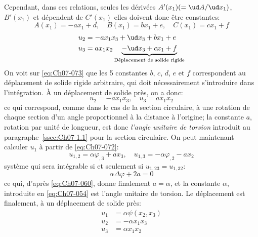 Cependant, dans ces relations, seules les dérivées $A'(x_1) (=\ud A /\ud x_1)$, $B'(x_1)$ et dépendent de $C'(x_1)$  elles doivent donc être constantes:
\[
A(x_1) = -a x_1 +d,\quad B(x_1) = b x_1 +e,\quad C(x_1) = c x_1 +f
\]
\begin{equation}
    \begin{aligned}
        u_2 &= -a x_1 x_3 + \ud x_3 + b x_1 + e\\
        u_3 &= a x_1 x_2 \underbrace{- \ud x_3 + c x_1 + f}_{\text{Déplacement de solide rigide}}
    \end{aligned}
    \label{eq:Ch07-073} 
\end{equation}
On voit sur \eqref{eq:Ch07-073} que les 5 constantes $b$, $c$, $d$, $e$ et $f$ correspondent au déplacement de solide rigide arbitraire, qui doit nécessairement s'introduire dans l'intégration.
À un déplacement de solide près, on a donc: 
\begin{equation}
    u_2 = -a x_1 x_3, \quad u_3 = a x_1 x_2
    \label{eq:Ch07-074}
\end{equation}
ce qui correspond, comme dans le cas de la section circulaire, à une rotation de chaque section d'un angle proportionnel à la distance à l'origine; la constante $a$, rotation par unité de longueur, est donc \emph{l'angle unitaire de torsion} introduit au paragraphe~\ref{ssec:Ch07-1.1} pour la section circulaire.
On peut maintenant calculer $u_1$ à partir de \eqref{eq:Ch07-072}: 
\begin{equation}
    u_{1,2} = \alpha \varphi_{,3} + a x_3, \quad u_{1,3} = -\alpha \varphi_{,2} - a x_2
    \label{eq:Ch07-075}
\end{equation}
système qui sera intégrable si et seulement si $u_{1,23} = u_{1,32}$:
\begin{displaymath}
    \alpha \Delta \varphi + 2 a = 0
\end{displaymath}
ce qui, d'après \eqref{eq:Ch07-060}, donne finalement $a=\alpha$, et la constante $\alpha$, introduite en \eqref{eq:Ch07-054} est l'angle unitaire de torsion. Le déplacement est finalement, à un déplacement de solide près: 
\begin{equation}
    \begin{aligned}
        u_1 &= \alpha \psi (x_2, x_3) \\
        u_2 &= - \alpha x_1 x_3 \\
        u_3 &= \alpha x_1 x_2
    \end{aligned}
    \label{eq:Ch07-076}
\end{equation}
